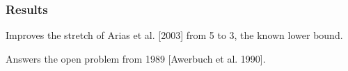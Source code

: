 \documentclass[10pt, compress]{beamer}
\begin{document}
\begin{frame}[fragile]
  \frametitle{Results}
  Improves the stretch of Arias et al. [2003] from 5 to 3, the known lower bound.

  Answers the open problem from 1989 [Awerbuch et al. 1990].

\end{frame}


\end{document}

